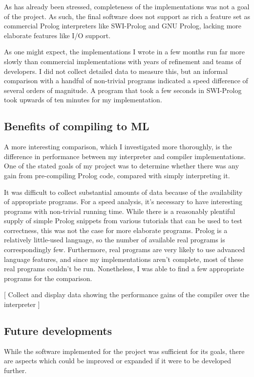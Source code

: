 \documentclass[12pt]{article}
\begin{document}
As has already been stressed, completeness of the implementations was not a goal of the project. As such, the final software does not support as rich a feature set as commercial Prolog interpreters like SWI-Prolog and GNU Prolog, lacking more elaborate features like I/O support.

As one might expect, the implementations I wrote in a few months run far more slowly than commercial implementations with years of refinement and teams of developers. I did not collect detailed data to measure this, but an informal comparison with a handful of non-trivial programs indicated a speed difference of several orders of magnitude. A program that took a few seconds in SWI-Prolog took upwards of ten minutes for my implementation.

\subsection{Benefits of compiling to ML}

A more interesting comparison, which I investigated more thoroughly, is the difference in performance between my interpreter and compiler implementations. One of the stated goals of my project was to determine whether there was any gain from pre-compiling Prolog code, compared with simply interpreting it.

It was difficult to collect substantial amounts of data because of the availability of appropriate programs. For a speed analysis, it's necessary to have interesting programs with non-trivial running time. While there is a reasonably plentiful supply of simple Prolog snippets from various tutorials that can be used to test correctness, this was not the case for more elaborate programs. Prolog is a relatively little-used language, so the number of available real programs is correspondingly few. Furthermore, real programs are very likely to use advanced language features, and since my implementations aren't complete, most of these real programs couldn't be run. Nonetheless, I was able to find a few appropriate programs for the comparison.

[ Collect and display data showing the performance gains of the compiler over the interpreter ]

\subsection{Future developments}

While the software implemented for the project was sufficient for its goals, there are aspects which could be improved or expanded if it were to be developed further.
\end{document}
